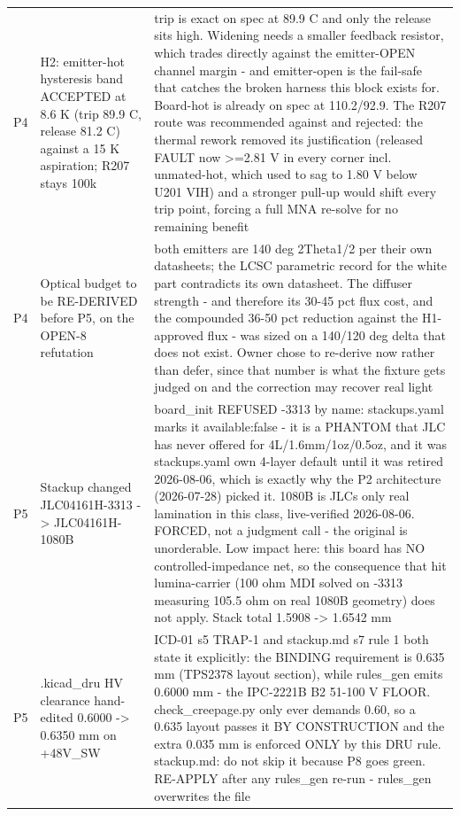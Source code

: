 \documentclass[11pt,a4paper]{article}
\begin{document}
{\begin{longtable}{lp{5.2cm}p{7.2cm}}
P4 & H2: emitter-hot hysteresis band ACCEPTED at 8.6 K (trip 89.9 C, release 81.2 C) against a 15 K aspiration; R207 stays 100k & trip is exact on spec at 89.9 C and only the release sits high. Widening needs a smaller feedback resistor, which trades directly against the emitter-OPEN channel margin - and emitter-open is the fail-safe that catches the broken harness this block exists for. Board-hot is already on spec at 110.2/92.9. The R207 route was recommended against and rejected: the thermal rework removed its justification (released FAULT now \textgreater{}=2.81 V in every corner incl. unmated-hot, which used to sag to 1.80 V below U201 VIH) and a stronger pull-up would shift every trip point, forcing a full MNA re-solve for no remaining benefit \\
P4 & Optical budget to be RE-DERIVED before P5, on the OPEN-8 refutation & both emitters are 140 deg 2Theta1/2 per their own datasheets; the LCSC parametric record for the white part contradicts its own datasheet. The diffuser strength - and therefore its 30-45 pct flux cost, and the compounded 36-50 pct reduction against the H1-approved flux - was sized on a 140/120 deg delta that does not exist. Owner chose to re-derive now rather than defer, since that number is what the fixture gets judged on and the correction may recover real light \\
P5 & Stackup changed JLC04161H-3313 -\textgreater{} JLC04161H-1080B & board\_init REFUSED -3313 by name: stackups.yaml marks it available:false - it is a PHANTOM that JLC has never offered for 4L/1.6mm/1oz/0.5oz, and it was stackups.yaml own 4-layer default until it was retired 2026-08-06, which is exactly why the P2 architecture (2026-07-28) picked it. 1080B is JLCs only real lamination in this class, live-verified 2026-08-06. FORCED, not a judgment call - the original is unorderable. Low impact here: this board has NO controlled-impedance net, so the consequence that hit lumina-carrier (100 ohm MDI solved on -3313 measuring 105.5 ohm on real 1080B geometry) does not apply. Stack total 1.5908 -\textgreater{} 1.6542 mm \\
P5 & .kicad\_dru HV clearance hand-edited 0.6000 -\textgreater{} 0.6350 mm on +48V\_SW & ICD-01 s5 TRAP-1 and stackup.md s7 rule 1 both state it explicitly: the BINDING requirement is 0.635 mm (TPS2378 layout section), while rules\_gen emits 0.6000 mm - the IPC-2221B B2 51-100 V FLOOR. check\_creepage.py only ever demands 0.60, so a 0.635 layout passes it BY CONSTRUCTION and the extra 0.035 mm is enforced ONLY by this DRU rule. stackup.md: do not skip it because P8 goes green. RE-APPLY after any rules\_gen re-run - rules\_gen overwrites the file \\

\end{longtable}}
\end{document}
